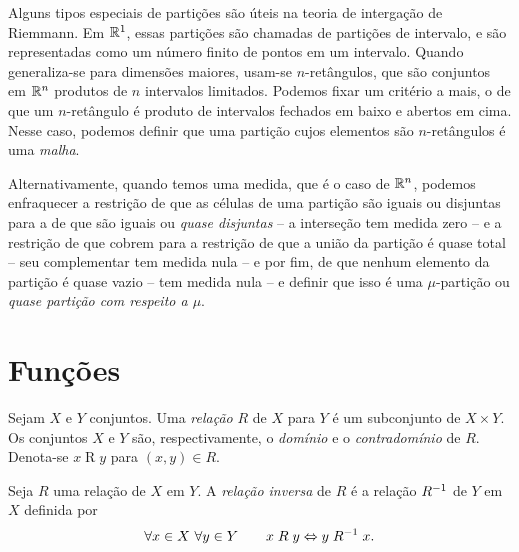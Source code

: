 Alguns tipos especiais de partições são úteis na teoria de intergação de Riemmann. Em $\mathbb{R}^1$, essas partições são chamadas de partições de intervalo, e são representadas como um número finito de pontos em um intervalo. Quando generaliza-se para dimensões maiores, usam-se $n$-retângulos, que são conjuntos em $\mathbb{R}^n$ produtos de $n$ intervalos limitados. Podemos fixar um critério a mais, o de que um $n$-retângulo é produto de intervalos fechados em baixo e abertos em cima. Nesse caso, podemos definir que uma partição cujos elementos são $n$-retângulos é uma \emph{malha}.

Alternativamente, quando temos uma medida, que é o caso de $\mathbb{R}^n$, podemos enfraquecer a restrição de que as células de uma partição são iguais ou disjuntas para a de que são iguais ou \emph{quase disjuntas} \--- a interseção tem medida zero \--- e a restrição de que cobrem para a restrição de que a união da partição é quase total \--- seu complementar tem medida nula \--- e por fim, de que nenhum elemento da partição é quase vazio \--- tem medida nula \--- e definir que isso é uma $\mu$-partição ou \emph{quase partição com respeito a $\mu$}.



























\chapter{Funções}

\begin{defi}
Sejam $X$ e $Y$ conjuntos. Uma \emph{relação} $R$ de $X$ para $Y$ é um subconjunto de $X \times Y$. Os conjuntos $X$ e $Y$ são, respectivamente, o \emph{domínio} e o \emph{contradomínio} de $R$. Denota-se $x \mathrel{R} y$ para $(x,y) \in R$.
\end{defi}

\begin{defi}
Seja $R$ uma relação de $X$ em $Y$. A \emph{relação inversa} de $R$ é a relação $R^{-1}$ de $Y$ em $X$ definida por
	\begin{equation*}
	\forall x \in X\ \forall y \in Y \qquad x \mathrel{R} y \Leftrightarrow y \mathrel{R^{-1}} x.
	\end{equation*}
\end{defi}


